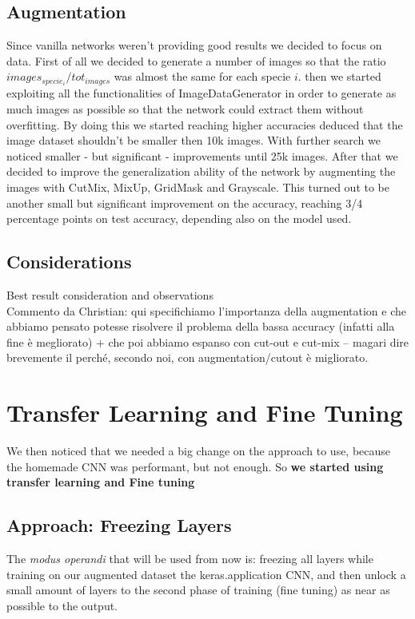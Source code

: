 \documentclass[10pt]{article}
\begin{document}
\subsection{Augmentation}\label{subsec:augmentation}
Since vanilla networks weren't providing good results we decided to focus on data.
First of all we decided to generate a number of images so that the ratio $images_{specie_i}/tot_{images}$ was almost the same for each specie $i$.
then we started exploiting all the functionalities of ImageDataGenerator in order to generate as much images as possible so that the network could extract them without overfitting.
By doing this we started reaching higher accuracies deduced that the image dataset shouldn't be smaller then 10k images.
With further search we noticed smaller - but significant - improvements until 25k images.
After that we decided to improve the generalization ability of the network by augmenting the images with CutMix, MixUp, GridMask and Grayscale.
This turned out to be another small but significant improvement on the accuracy, reaching 3/4 percentage points on test accuracy, depending also on the model used.



\subsection{Considerations}
Best result consideration and observations \\
Commento da Christian: qui specifichiamo l'importanza della augmentation e che abbiamo pensato potesse risolvere il problema della bassa accuracy (infatti alla fine è megliorato) + che poi abbiamo espanso con cut-out e cut-mix -- magari dire brevemente il perché, secondo noi, con augmentation/cutout è migliorato.
\section{Transfer Learning and Fine Tuning}
We then noticed that we needed a big change on the approach to use, because the homemade
CNN was performant, but not enough. So \textbf{we started using transfer learning and Fine tuning}

\subsection{Approach: Freezing Layers}
The \textit{modus operandi} that will be used from now is: freezing all layers while training on our augmented dataset the keras.application
CNN, and then unlock a small amount of layers to the second phase of training (fine tuning) as near as possible to the output.
\end{document}
